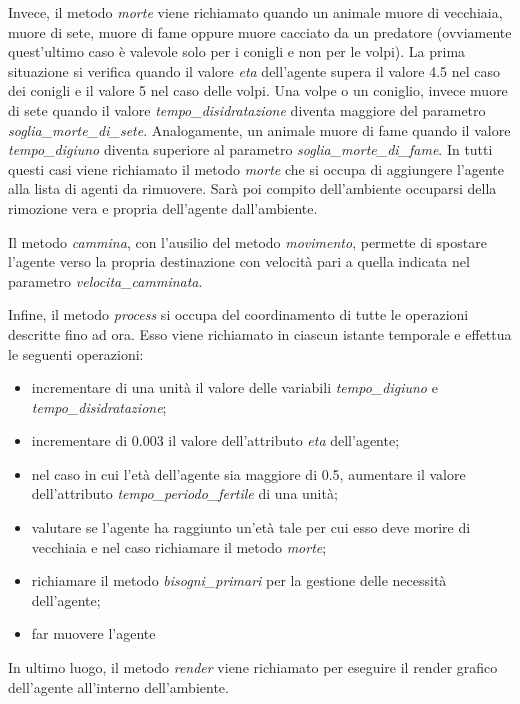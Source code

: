 \documentclass[11pt]{article}
\begin{document}
Invece, il metodo \emph{morte} viene richiamato quando un animale muore di vecchiaia, muore di sete, muore di fame oppure muore cacciato da un predatore (ovviamente quest'ultimo caso è valevole solo per i conigli e non per le volpi). La prima situazione si verifica quando il valore \emph{eta} dell'agente supera il valore 4.5 nel caso dei conigli e il valore 5 nel caso delle volpi. Una volpe o un coniglio, invece muore di sete quando il valore \emph{tempo\_disidratazione} diventa maggiore del parametro \emph{soglia\_morte\_di\_sete}. Analogamente, un animale muore di fame quando il valore \emph{tempo\_digiuno} diventa superiore al parametro \emph{soglia\_morte\_di\_fame}. In tutti questi casi viene richiamato il metodo \emph{morte} che si occupa di aggiungere l'agente alla lista di agenti da rimuovere. Sarà poi compito dell'ambiente occuparsi della rimozione vera e propria dell'agente dall'ambiente. 

Il metodo \emph{cammina}, con l'ausilio del metodo \emph{movimento}, permette di spostare l'agente verso la propria destinazione con velocità pari a quella indicata nel parametro \emph{velocita\_camminata}. 

\newpage

Infine, il metodo \emph{process} si occupa del coordinamento di tutte le operazioni descritte fino ad ora. Esso viene richiamato in ciascun istante temporale e effettua le seguenti operazioni:
\begin{itemize}
    \item incrementare di una unità il valore delle variabili \emph{tempo\_digiuno} e \emph{tempo\_disidratazione};
    \item incrementare di 0.003 il valore dell'attributo \emph{eta} dell'agente;
    \item nel caso in cui l'età dell'agente sia maggiore di 0.5, aumentare il valore dell'attributo \emph{tempo\_periodo\_fertile} di una unità;
    \item valutare se l'agente ha raggiunto un'età tale per cui esso deve morire di vecchiaia e nel caso richiamare il metodo \emph{morte};
    \item richiamare il metodo \emph{bisogni\_primari} per la gestione delle necessità dell'agente;
    \item far muovere l'agente
\end{itemize}

In ultimo luogo, il metodo \emph{render} viene richiamato per eseguire il render grafico dell'agente all'interno dell'ambiente.
\end{document}
